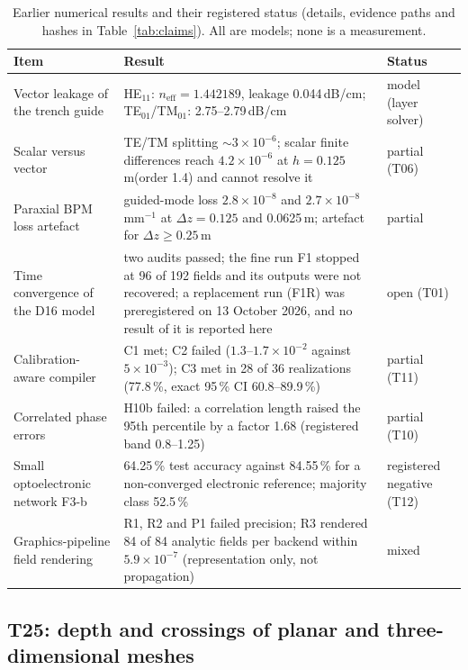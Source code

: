 \documentclass[11pt,a4paper]{article}
\newcommand{\dBcm}{\,dB/cm\xspace}
\newcommand{\um}{\,\textmu m\xspace}
\begin{document}
\begin{table}[t]
\centering\small
\caption{Earlier numerical results and their registered status (details, evidence paths and hashes in Table~\ref{tab:claims}). All are models; none is a measurement.}
\label{tab:prior}
\begin{tabularx}{\linewidth}{>{\raggedright\arraybackslash}p{3.7cm}X>{\raggedright\arraybackslash}p{2.6cm}}
\toprule
Item & Result & Status \\
\midrule
Vector leakage of the trench guide & HE$_{11}$: $n_\mathrm{eff}=1.442189$, leakage 0.044\dBcm; TE$_{01}$/TM$_{01}$: 2.75--2.79\dBcm & model (layer solver) \\
Scalar versus vector & TE/TM splitting $\sim3\times10^{-6}$; scalar finite differences reach $4.2\times10^{-6}$ at $h=0.125$\um (order 1.4) and cannot resolve it & partial (T06) \\
Paraxial BPM loss artefact & guided-mode loss $2.8\times10^{-8}$ and $2.7\times10^{-8}$\,mm$^{-1}$ at $\Delta z=0.125$ and 0.0625\um; artefact for $\Delta z\ge0.25$\um & partial \\
Time convergence of the D16 model & two audits passed; the fine run F1 stopped at 96 of 192 fields and its outputs were not recovered; a replacement run (F1R) was preregistered on 13 October 2026, and no result of it is reported here & open (T01) \\
Calibration-aware compiler & C1 met; C2 failed ($1.3$--$1.7\times10^{-2}$ against $5\times10^{-3}$); C3 met in 28 of 36 realizations (77.8\,\%, exact 95\,\% CI 60.8--89.9\,\%) & partial (T11) \\
Correlated phase errors & H10b failed: a correlation length raised the 95th percentile by a factor 1.68 (registered band 0.8--1.25) & partial (T10) \\
Small optoelectronic network F3-b & 64.25\,\% test accuracy against 84.55\,\% for a non-converged electronic reference; majority class 52.5\,\% & registered negative (T12) \\
Graphics-pipeline field rendering & R1, R2 and P1 failed precision; R3 rendered 84 of 84 analytic fields per backend within $5.9\times10^{-7}$ (representation only, not propagation) & mixed \\
\bottomrule
\end{tabularx}
\end{table}

\subsection{T25: depth and crossings of planar and three-dimensional meshes}
\label{sec:t25}
\end{document}
